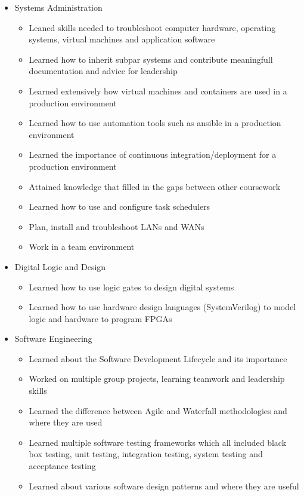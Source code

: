 \documentclass[12pt,letterpaper]{article}
\begin{document}
	\begin{itemize}
		\item Systems Administration
		\begin{itemize}
			\item Leaned skills needed to troubleshoot computer hardware, operating systems, virtual machines and application software
			\item Learned how to inherit subpar systems and contribute meaningfull documentation and advice for leadership
			\item Learned extensively how virtual machines and containers are used in a production environment
			\item Learned how to use automation tools such as ansible in a production environment
			\item Learned the importance of continuous integration/deployment for a production environment
			\item Attained knowledge that filled in the gaps between other coursework
			\item Learned how to use and configure task schedulers
			\item Plan, install and troubleshoot LANs and WANs
			\item Work in a team environment
		\end{itemize}

		\item Digital Logic and Design
		\begin{itemize}
			\item Learned how to use logic gates to design digital systems
			\item Learned how to use hardware design languages (SystemVerilog) to model logic and hardware to program FPGAs
		\end{itemize}

		\item Software Engineering
		\begin{itemize}
			\item Learned about the Software Development Lifecycle and its importance 
			\item Worked on multiple group projects, learning teamwork and leadership skills
			\item Learned the difference between Agile and Waterfall methodologies and where they are used
			\item Learned multiple software testing frameworks which all included black box testing, unit testing, integration testing, system testing and acceptance testing
			\item Learned about various software design patterns and where they are useful
		\end{itemize}


\end{itemize}
\end{document}
